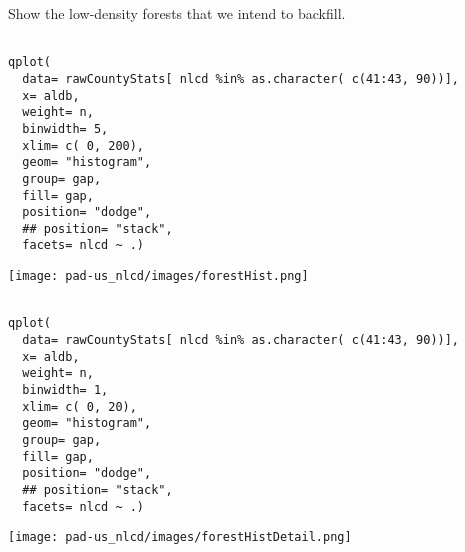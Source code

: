 \documentclass[11pt]{article}
\begin{document}
Show the low-density forests that we intend to backfill.



\begin{verbatim}

qplot(
  data= rawCountyStats[ nlcd %in% as.character( c(41:43, 90))],
  x= aldb,
  weight= n,
  binwidth= 5,
  xlim= c( 0, 200),
  geom= "histogram", 
  group= gap,
  fill= gap,
  position= "dodge",
  ## position= "stack",
  facets= nlcd ~ .)
\end{verbatim}

\texttt{[image: pad-us\_nlcd/images/forestHist.png]}



\begin{verbatim}

qplot(
  data= rawCountyStats[ nlcd %in% as.character( c(41:43, 90))],
  x= aldb,
  weight= n,
  binwidth= 1,
  xlim= c( 0, 20),
  geom= "histogram", 
  group= gap,
  fill= gap,
  position= "dodge",
  ## position= "stack",
  facets= nlcd ~ .)
\end{verbatim}

\texttt{[image: pad-us\_nlcd/images/forestHistDetail.png]}
\end{document}
